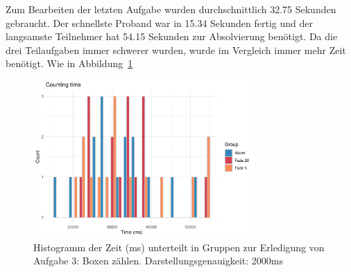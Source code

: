 Zum Bearbeiten der letzten Aufgabe wurden durchschnittlich 32.75 Sekunden gebraucht. Der schnellste Proband war in 15.34 Sekunden fertig und der langsamste Teilnehmer hat 54.15 Sekunden zur Absolvierung benötigt. Da die drei Teilaufgaben immer schwerer wurden, wurde im Vergleich immer mehr Zeit benötigt.
Wie in Abbildung~\ref{fig:countingTimeHistogram}

\begin{figure}[H]
	\centering
	\includegraphics[width=0.75\textwidth]{./_StudyResults/countingTimeHist}
	\caption{Histogramm der Zeit (ms) unterteilt in Gruppen zur Erledigung von Aufgabe 3: Boxen zählen. Darstellungsgenauigkeit: 2000ms}
	\label{fig:countingTimeHistogram}
\end{figure}

